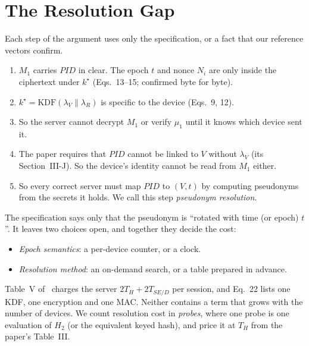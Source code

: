 \section{The Resolution Gap}\label{sec:gap}
Each step of the argument uses only the specification, or a fact that our reference vectors confirm.
\begin{enumerate}
\item $M_1$ carries $PID$ in clear. The epoch $t$ and nonce $N_i$ are only inside the ciphertext under $k^\star$
(Eqs.~13--15; confirmed byte for byte).
\item $k^\star=\mathrm{KDF}(\lambda_V\|\lambda_R)$ is specific to the device (Eqs.~9, 12).
\item So the server cannot decrypt $M_1$ or verify $\mu_1$ until it knows which device sent it.
\item The paper requires that $PID$ cannot be linked to $V$ without $\lambda_V$ (its Section~III-J). So the device's
identity cannot be read from $M_1$ either.
\item So every correct server must map $PID$ to $(V,t)$ by computing pseudonyms from the secrets it holds. We call this
step \emph{pseudonym resolution}.
\end{enumerate}
The specification says only that the pseudonym is ``rotated with time (or epoch) $t$''. It leaves two choices open, and
together they decide the cost:
\begin{itemize}
\item \emph{Epoch semantics}: a per-device counter, or a clock.
\item \emph{Resolution method}: an on-demand search, or a table prepared in advance.
\end{itemize}
Table~V of~\cite{base} charges the server $2T_H+2T_{SE/D}$ per session, and Eq.~22 lists one KDF, one encryption and one
MAC. Neither contains a term that grows with the number of devices. We count resolution cost in \emph{probes}, where one
probe is one evaluation of $H_2$ (or the equivalent keyed hash), and price it at $T_H$ from the paper's Table~III.

